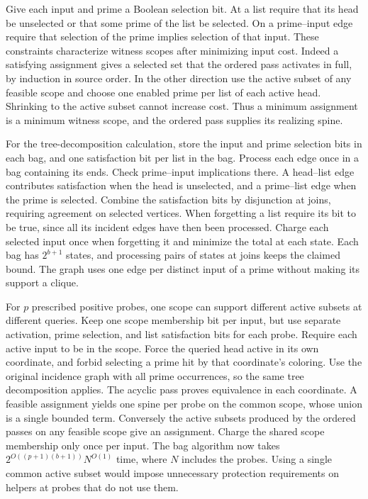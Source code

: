 Give each input and prime a Boolean selection
bit. At a list require that its head be
unselected or that some prime of the list be
selected. On a prime--input edge require that
selection of the prime implies selection of
that input. These constraints characterize
witness scopes after minimizing input cost.
Indeed a satisfying assignment gives a selected
set that the ordered pass activates in full,
by induction in source order. In the other
direction use the active subset of any feasible
scope and choose one enabled prime per list
of each active head. Shrinking to the active
subset cannot increase cost. Thus a minimum
assignment is a minimum witness scope, and
the ordered pass supplies its realizing spine.

For the tree-decomposition calculation, store
the input and prime selection bits in each bag,
and one satisfaction bit per list in the bag.
Process each edge once in a bag containing its
ends. Check prime--input implications there.
A head--list edge contributes satisfaction
when the head is unselected, and a prime--list
edge when the prime is selected. Combine the
satisfaction bits by disjunction at joins,
requiring agreement on selected vertices.
When forgetting a list require its bit to be
true, since all its incident edges have then
been processed. Charge each selected input
once when forgetting it and minimize the
total at each state. Each bag has
$2^{b+1}$ states, and processing pairs of
states at joins keeps the claimed bound.
The graph uses one edge per distinct input
of a prime without making its support a
clique.

For $p$ prescribed positive probes, one scope
can support different active subsets at different
queries. Keep one scope membership bit per input,
but use separate activation, prime selection,
and list satisfaction bits for each probe.
Require each active input to be in the scope.
Force the queried head active in its own
coordinate, and forbid selecting a prime hit by
that coordinate's coloring. Use the original
incidence graph with all prime occurrences,
so the same tree decomposition applies. The
acyclic pass proves equivalence in each
coordinate. A feasible assignment yields
one spine per probe on the common scope,
whose union is a single bounded term.
Conversely the active subsets produced by
the ordered passes on any feasible scope
give an assignment. Charge the shared scope
membership only once per input. The bag
algorithm now takes $2^{O((p+1)(b+1))}N^{O(1)}$
time, where $N$ includes the probes. Using a
single common active subset would impose
unnecessary protection requirements on
helpers at probes that do not use them.

